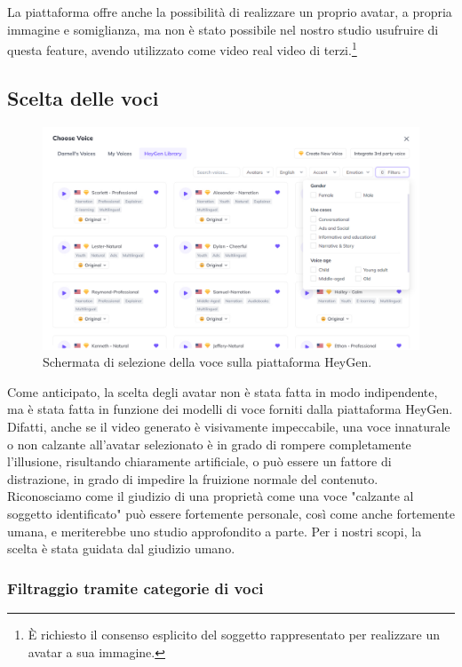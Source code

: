 La piattaforma offre anche la possibilità di realizzare un proprio avatar, a propria immagine e somiglianza, ma non è stato possibile nel nostro studio usufruire di questa feature, avendo utilizzato come video real video di terzi.\footnote{È richiesto il consenso esplicito del soggetto rappresentato per realizzare un avatar a sua immagine.} 


\subsection{Scelta delle voci}

\begin{figure}[t]
    \centering
    \includegraphics[width=0.9\linewidth]{images/voice_selection}
    \caption{Schermata di selezione della voce sulla piattaforma HeyGen.}
    \label{fig:voice_selection}
\end{figure}

Come anticipato, la scelta degli avatar non è stata fatta in modo indipendente, ma è stata fatta in funzione dei modelli di voce forniti dalla piattaforma HeyGen. Difatti, anche se il video generato è visivamente impeccabile, una voce innaturale o non calzante all'avatar selezionato è in grado di rompere completamente l'illusione, risultando chiaramente artificiale, o può essere un fattore di distrazione, in grado di impedire la fruizione normale del contenuto. Riconosciamo come il giudizio di una proprietà come una voce "calzante al soggetto identificato" può essere fortemente personale, così come anche fortemente umana, e meriterebbe uno studio approfondito a parte. Per i nostri scopi, la scelta è stata guidata dal giudizio umano. 

\subsubsection{Filtraggio tramite categorie di voci}


